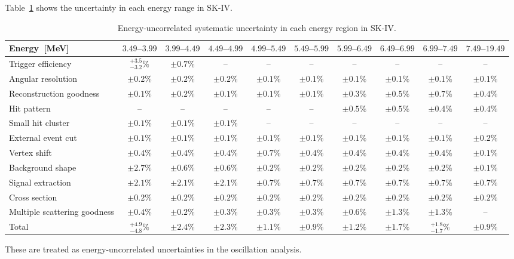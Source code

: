 \documentclass[aps,prd,reprint,superscriptaddress,floatfix,altaffilletter,nofootinbib]{revtex4-2}
\begin{document}
Table~\ref{tb:syst_spect} shows the uncertainty in each energy range in SK-IV.
\begin{table}[htb]
\begin{center}
\caption{Energy-uncorrelated systematic uncertainty in each energy region in SK-IV.\label{tb:syst_spect}}
\begin{tabular}{lccccccccc} 
\hline\hline
Energy~[MeV] & $3.49$--$3.99$ & $3.99$--$4.49$ & $4.49$--$4.99$ & $4.99$--$5.49$ & $5.49$--$5.99$ & $5.99$--$6.49$ & $6.49$--$6.99$ & $6.99$--$7.49$ & $7.49$--$19.49$ \\
\hline
Trigger efficiency & $^{+3.5}_{-3.2}\%$ & $ \pm 0.7\%$ & -- & -- & -- & -- & -- & -- & -- \\
Angular resolution & $\pm0.2\%$ & $\pm0.2\%$ & $\pm0.2\%$ & $\pm0.1\%$ & $\pm0.1\%$ & $\pm0.1\%$ & $\pm0.1\%$ & $\pm0.1\%$ & $\pm0.1\%$ \\
Reconstruction goodness &$\pm0.1\%$& $\pm0.2\%$ & $\pm0.1\%$ & $\pm 0.1\%$ & $\pm0.1\%$ & $\pm 0.3\%$ & $\pm 0.5\%$ & $\pm 0.7\%$ & $\pm 0.4\%$ \\
Hit pattern & -- & -- & -- & -- & -- & $\pm0.5\%$ & $\pm 0.5\%$ & $\pm 0.4\%$ & $\pm 0.4\%$ \\
Small hit cluster &$\pm0.1\%$ & $ \pm 0.1\%$& $\pm0.1\%$ & -- & -- & -- & -- & -- & -- \\
External event cut & $\pm 0.1\%$ & $\pm 0.1\%$ & $\pm 0.1\%$ & $\pm 0.1\%$ & $\pm 0.1\%$ & $\pm 0.1\%$ & $\pm 0.1\%$ & $\pm 0.1\%$ & $\pm 0.2\%$ \\
Vertex shift & $\pm 0.4\%$ & $\pm 0.4\%$ & $\pm 0.4\%$ & $\pm 0.7\%$ & $\pm 0.4\%$ & $\pm 0.4\%$ & $\pm 0.4\%$ & $\pm 0.4\%$ & $\pm 0.1\%$ \\
Background shape & $\pm 2.7\%$ & $\pm 0.6\%$ & $\pm 0.6\%$ & $\pm 0.2\%$ & $\pm 0.2\%$ & $\pm 0.2\%$ & $\pm 0.2\%$ & $\pm 0.2\%$ & $\pm 0.1\%$ \\
Signal extraction & $\pm 2.1\%$ & $\pm 2.1\%$ & $\pm 2.1\%$ & $\pm 0.7\%$ & $\pm 0.7\%$ & $\pm 0.7\%$ & $ \pm 0.7\%$ & $\pm 0.7\%$ & $\pm0.7\%$ \\
Cross section &$\pm 0.2\%$ & $\pm 0.2\%$ & $\pm 0.2\%$ & $\pm 0.2\%$ & $\pm 0.2\%$ & $\pm 0.2\%$ & $\pm 0.2\%$ & $\pm 0.2\%$ & $\pm0.2\%$ \\
Multiple scattering goodness & $\pm 0.4\%$ & $\pm 0.2\%$ & $\pm 0.3\%$ & $\pm 0.3\%$ & $\pm 0.3\%$ & $\pm 0.6\%$ & $\pm 1.3\%$ & $\pm 1.3\%$ & -- \\ \hline
Total &$^{+4.9}_{-4.8}\%$ & $\pm2.4\%$ & $\pm2.3\%$ & $\pm 1.1\%$ & $\pm0.9\%$ & $\pm 1.2\%$ & $\pm 1.7\%$ & $^{+1.8}_{-1.7}\%$ & $\pm 0.9\%$ \\
\hline\hline
\end{tabular}
\end{center}
\end{table}
These are treated as energy-uncorrelated uncertainties in the oscillation analysis.
\end{document}

